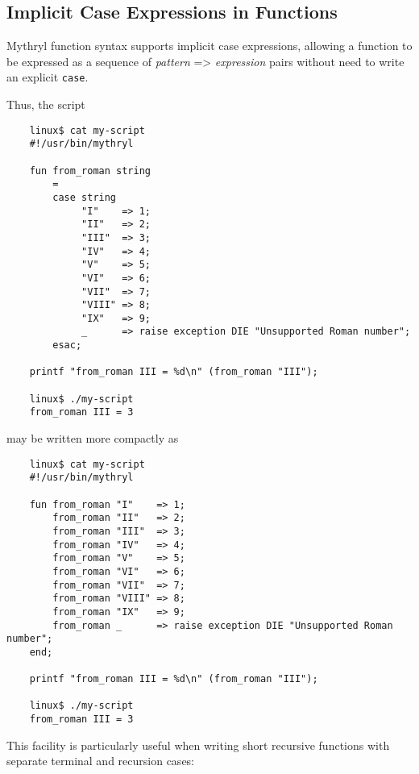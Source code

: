 \cutend*



\subsection{Implicit Case Expressions in Functions}
\label{section:ref:functions:implicit-case-expressions-in-functions}

Mythryl function syntax supports implicit case expressions, allowing 
a function to be expressed as a sequence of {\it pattern} => {\it expression} 
pairs without need to write an explicit {\tt case}.

Thus, the script

\begin{verbatim}
    linux$ cat my-script
    #!/usr/bin/mythryl

    fun from_roman string
        =
        case string
             "I"    => 1;
             "II"   => 2;
             "III"  => 3;
             "IV"   => 4;
             "V"    => 5;
             "VI"   => 6;
             "VII"  => 7;
             "VIII" => 8;
             "IX"   => 9;
             _      => raise exception DIE "Unsupported Roman number";
        esac;

    printf "from_roman III = %d\n" (from_roman "III");

    linux$ ./my-script
    from_roman III = 3
\end{verbatim}

may be written more compactly as

\begin{verbatim}
    linux$ cat my-script
    #!/usr/bin/mythryl

    fun from_roman "I"    => 1;
        from_roman "II"   => 2;
        from_roman "III"  => 3;
        from_roman "IV"   => 4;
        from_roman "V"    => 5;
        from_roman "VI"   => 6;
        from_roman "VII"  => 7;
        from_roman "VIII" => 8;
        from_roman "IX"   => 9;
        from_roman _      => raise exception DIE "Unsupported Roman number";
    end;

    printf "from_roman III = %d\n" (from_roman "III");

    linux$ ./my-script
    from_roman III = 3
\end{verbatim}

This facility is particularly useful when writing short 
recursive functions with separate terminal and recursion 
cases:

